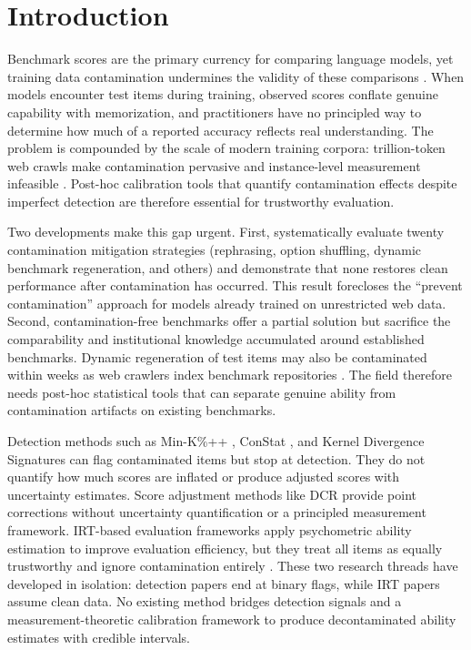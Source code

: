 \section{Introduction}\label{sec:introduction}

Benchmark scores are the primary currency for comparing language models, yet training data contamination undermines the validity of these comparisons \citep{hendrycks2021mmlu,chang2025benchmarking}. When models encounter test items during training, observed scores conflate genuine capability with memorization, and practitioners have no principled way to determine how much of a reported accuracy reflects real understanding. The problem is compounded by the scale of modern training corpora: trillion-token web crawls make contamination pervasive and instance-level measurement infeasible \citep{oren2024proving}. Post-hoc calibration tools that quantify contamination effects despite imperfect detection are therefore essential for trustworthy evaluation.

Two developments make this gap urgent. First, \citet{sun2025emperor} systematically evaluate twenty contamination mitigation strategies (rephrasing, option shuffling, dynamic benchmark regeneration, and others) and demonstrate that none restores clean performance after contamination has occurred. This result forecloses the ``prevent contamination'' approach for models already trained on unrestricted web data. Second, contamination-free benchmarks \citep{white2024livebench} offer a partial solution but sacrifice the comparability and institutional knowledge accumulated around established benchmarks. Dynamic regeneration of test items may also be contaminated within weeks as web crawlers index benchmark repositories \citep{dong_2024_cdd}. The field therefore needs post-hoc statistical tools that can separate genuine ability from contamination artifacts on existing benchmarks.

Detection methods such as Min-K\%++ \citep{zhang_2024_minkpp}, ConStat \citep{dekoninck2024constat}, and Kernel Divergence Signatures \citep{choi_2025_kds} can flag contaminated items but stop at detection. They do not quantify how much scores are inflated or produce adjusted scores with uncertainty estimates. Score adjustment methods like DCR \citep{xu2025dcr} provide point corrections without uncertainty quantification or a principled measurement framework. IRT-based evaluation frameworks \citep{polo_2024_tinybenchmarks,habba_2025_growing_pains} apply psychometric ability estimation to improve evaluation efficiency, but they treat all items as equally trustworthy and ignore contamination entirely \citep{lalor_2024_irt_nlp}. These two research threads have developed in isolation: detection papers end at binary flags, while IRT papers assume clean data. No existing method bridges detection signals and a measurement-theoretic calibration framework to produce decontaminated ability estimates with credible intervals.

